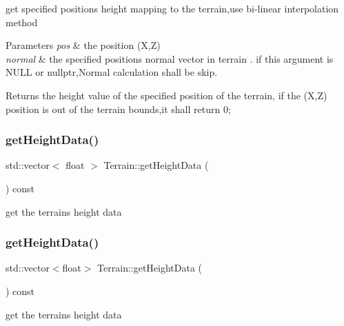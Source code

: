 get specified position\textquotesingle{}s height mapping to the terrain,use bi-\/linear interpolation method 
\begin{DoxyParams}{Parameters}
{\em pos} & the position (X,Z) \\
\hline
{\em normal} & the specified position\textquotesingle{}s normal vector in terrain . if this argument is N\+U\+LL or nullptr,Normal calculation shall be skip. \\
\hline
\end{DoxyParams}
\begin{DoxyReturn}{Returns}
the height value of the specified position of the terrain, if the (X,Z) position is out of the terrain bounds,it shall return 0; 
\end{DoxyReturn}
\mbox{\label{classTerrain_ab8bbb0e74cb1271d052c91e40b8e2ebb}} 
\subsubsection{\texorpdfstring{get\+Height\+Data()}{getHeightData()}\hspace{0.1cm}{\footnotesize\ttfamily [1/2]}}
{\footnotesize\ttfamily std\+::vector$<$ float $>$ Terrain\+::get\+Height\+Data (\begin{DoxyParamCaption}{ }\end{DoxyParamCaption}) const}

get the terrain\textquotesingle{}s height data \mbox{\label{classTerrain_aa00c8051d3fbc53ea1656702fb90ee6e}} 
\subsubsection{\texorpdfstring{get\+Height\+Data()}{getHeightData()}\hspace{0.1cm}{\footnotesize\ttfamily [2/2]}}
{\footnotesize\ttfamily std\+::vector$<$float$>$ Terrain\+::get\+Height\+Data (\begin{DoxyParamCaption}{ }\end{DoxyParamCaption}) const}

get the terrain\textquotesingle{}s height data \mbox{\label{classTerrain_adbe691cc944f4d85745e2ab1f1f4f8ff}} 
